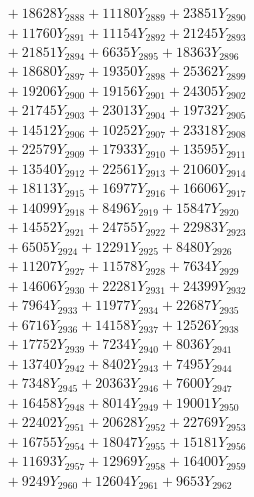 \documentclass[a4paper,10pt]{article}
\begin{document}
{\begin{align}
&\;  + 18628 Y_{2888} + 11180 Y_{2889} + 23851 Y_{2890} \\[0.3ex]
&\;  + 11760 Y_{2891} + 11154 Y_{2892} + 21245 Y_{2893} \\[0.3ex]
&\;  + 21851 Y_{2894} + 6635 Y_{2895} + 18363 Y_{2896} \\[0.3ex]
&\;  + 18680 Y_{2897} + 19350 Y_{2898} + 25362 Y_{2899} \\[0.3ex]
&\;  + 19206 Y_{2900} + 19156 Y_{2901} + 24305 Y_{2902} \\[0.3ex]
&\;  + 21745 Y_{2903} + 23013 Y_{2904} + 19732 Y_{2905} \\[0.3ex]
&\;  + 14512 Y_{2906} + 10252 Y_{2907} + 23318 Y_{2908} \\[0.5ex]\allowbreak
&\;  + 22579 Y_{2909} + 17933 Y_{2910} + 13595 Y_{2911} \\[0.3ex]
&\;  + 13540 Y_{2912} + 22561 Y_{2913} + 21060 Y_{2914} \\[0.3ex]
&\;  + 18113 Y_{2915} + 16977 Y_{2916} + 16606 Y_{2917} \\[0.3ex]
&\;  + 14099 Y_{2918} + 8496 Y_{2919} + 15847 Y_{2920} \\[0.3ex]
&\;  + 14552 Y_{2921} + 24755 Y_{2922} + 22983 Y_{2923} \\[0.3ex]
&\;  + 6505 Y_{2924} + 12291 Y_{2925} + 8480 Y_{2926} \\[0.3ex]
&\;  + 11207 Y_{2927} + 11578 Y_{2928} + 7634 Y_{2929} \\[0.3ex]
&\;  + 14606 Y_{2930} + 22281 Y_{2931} + 24399 Y_{2932} \\[0.3ex]
&\;  + 7964 Y_{2933} + 11977 Y_{2934} + 22687 Y_{2935} \\[0.3ex]
&\;  + 6716 Y_{2936} + 14158 Y_{2937} + 12526 Y_{2938} \\[0.5ex]\allowbreak
&\;  + 17752 Y_{2939} + 7234 Y_{2940} + 8036 Y_{2941} \\[0.3ex]
&\;  + 13740 Y_{2942} + 8402 Y_{2943} + 7495 Y_{2944} \\[0.3ex]
&\;  + 7348 Y_{2945} + 20363 Y_{2946} + 7600 Y_{2947} \\[0.3ex]
&\;  + 16458 Y_{2948} + 8014 Y_{2949} + 19001 Y_{2950} \\[0.3ex]
&\;  + 22402 Y_{2951} + 20628 Y_{2952} + 22769 Y_{2953} \\[0.3ex]
&\;  + 16755 Y_{2954} + 18047 Y_{2955} + 15181 Y_{2956} \\[0.3ex]
&\;  + 11693 Y_{2957} + 12969 Y_{2958} + 16400 Y_{2959} \\[0.3ex]
&\;  + 9249 Y_{2960} + 12604 Y_{2961} + 9653 Y_{2962} \\[0.3ex]

\end{align}}
\end{document}
